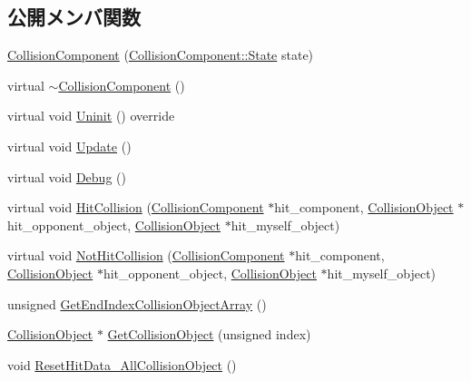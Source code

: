 \subsection*{公開メンバ関数}
\begin{DoxyCompactItemize}
\item 
\mbox{\hyperlink{class_collision_component_a11e15f7ce88bce8edff23a4d9d46b395}{Collision\+Component}} (\mbox{\hyperlink{class_collision_component_a91ba750c14ccd0f4857f0302f06084c6}{Collision\+Component\+::\+State}} state)
\item 
virtual \mbox{\hyperlink{class_collision_component_a41e4d8573038c18ea3cd873530e91a82}{$\sim$\+Collision\+Component}} ()
\item 
virtual void \mbox{\hyperlink{class_collision_component_aa75440061f7a60e8c4ee1dae18682cc0}{Uninit}} () override
\item 
virtual void \mbox{\hyperlink{class_collision_component_a3fa60fd8b4e8690f783c0f578949664e}{Update}} ()
\item 
virtual void \mbox{\hyperlink{class_collision_component_a542fdd782214ffe130a4e8cf55bca668}{Debug}} ()
\item 
virtual void \mbox{\hyperlink{class_collision_component_a50c4fea9d37eb22ac435ee5c2ce36254}{Hit\+Collision}} (\mbox{\hyperlink{class_collision_component}{Collision\+Component}} $\ast$hit\+\_\+component, \mbox{\hyperlink{class_collision_object}{Collision\+Object}} $\ast$hit\+\_\+opponent\+\_\+object, \mbox{\hyperlink{class_collision_object}{Collision\+Object}} $\ast$hit\+\_\+myself\+\_\+object)
\item 
virtual void \mbox{\hyperlink{class_collision_component_ad4d820d07872da11c9c1fd1b40157349}{Not\+Hit\+Collision}} (\mbox{\hyperlink{class_collision_component}{Collision\+Component}} $\ast$hit\+\_\+component, \mbox{\hyperlink{class_collision_object}{Collision\+Object}} $\ast$hit\+\_\+opponent\+\_\+object, \mbox{\hyperlink{class_collision_object}{Collision\+Object}} $\ast$hit\+\_\+myself\+\_\+object)
\item 
unsigned \mbox{\hyperlink{class_collision_component_ac761d5081e57b2055e574612d79d1950}{Get\+End\+Index\+Collision\+Object\+Array}} ()
\item 
\mbox{\hyperlink{class_collision_object}{Collision\+Object}} $\ast$ \mbox{\hyperlink{class_collision_component_a8301ad7604a1946de51eaad7ce6c4c72}{Get\+Collision\+Object}} (unsigned index)
\item 
void \mbox{\hyperlink{class_collision_component_a15b0f056baad5d48d14cc7a611ca768d}{Reset\+Hit\+Data\+\_\+\+All\+Collision\+Object}} ()

\end{DoxyCompactItemize}
